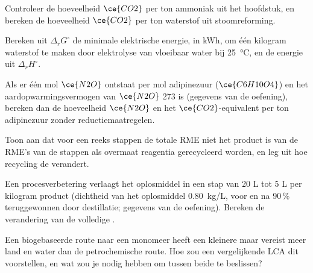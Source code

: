 \begin{exercise}[$\star\star$]\label{exo:b3:green-industrial:7}
Controleer de hoeveelheid $\ce{CO2}$ per ton ammoniak uit het hoofdstuk, en bereken de hoeveelheid $\ce{CO2}$ per ton
waterstof uit stoomreforming.
\end{exercise}

\begin{exercise}[$\star\star$]\label{exo:b3:green-industrial:8}
Bereken uit $\Delta_rG^\circ$ de minimale elektrische energie, in kWh, om één
kilogram waterstof te maken door elektrolyse van vloeibaar water bij \qty{25}{\celsius}, en de energie uit $\Delta_rH^\circ$.
\end{exercise}

\begin{exercise}[$\star\star$]\label{exo:b3:green-industrial:9}
Als er één mol $\ce{N2O}$ ontstaat per mol adipinezuur ($\ce{C6H10O4}$) en het aardopwarmingsvermogen
van $\ce{N2O}$ 273 is (gegevens van de oefening), bereken dan de hoeveelheid $\ce{N2O}$ en het $\ce{CO2}$-equivalent
per ton adipinezuur zonder reductiemaatregelen.
\end{exercise}

\begin{exercise}[$\star\star\star$]\label{exo:b3:green-industrial:10}
Toon aan dat voor een reeks stappen de totale RME niet het product is van
de RME's van de stappen als overmaat reagentia gerecycleerd worden, en
leg uit hoe recycling de  verandert.
\end{exercise}

\begin{exercise}[$\star\star\star$]\label{exo:b3:green-industrial:11}
Een procesverbetering verlaagt het oplosmiddel in een stap van 20 L tot
5 L per kilogram product (dichtheid van het oplosmiddel \qty{0.80}{kg/L}, voor en na 90\,\% teruggewonnen door destillatie; gegevens
van de oefening). Bereken de verandering van de volledige .
\end{exercise}

\begin{exercise}[$\star\star\star$]\label{exo:b3:green-industrial:12}
Een biogebaseerde route naar een monomeer heeft een kleinere
 maar vereist meer land en water dan de
petrochemische route. Hoe zou een vergelijkende LCA dit voorstellen, en
wat zou je nodig hebben om tussen beide te beslissen?
\end{exercise}

